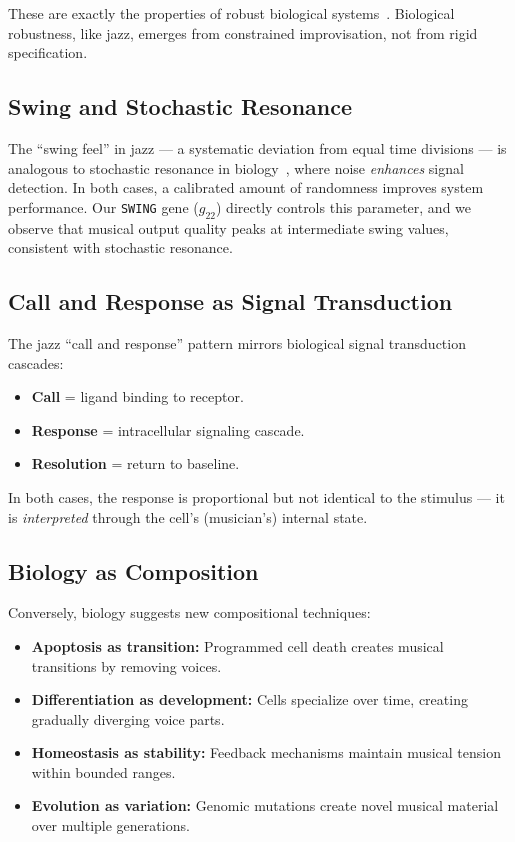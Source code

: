 \documentclass[11pt,a4paper]{article}
\begin{document}
These are exactly the properties of robust biological systems~\citep{kitano2007}. Biological robustness, like jazz, emerges from constrained improvisation, not from rigid specification.

\subsection{Swing and Stochastic Resonance}

The ``swing feel'' in jazz --- a systematic deviation from equal time divisions --- is analogous to stochastic resonance in biology~\citep{benzi1982}, where noise \emph{enhances} signal detection. In both cases, a calibrated amount of randomness improves system performance. Our \texttt{SWING} gene ($g_{22}$) directly controls this parameter, and we observe that musical output quality peaks at intermediate swing values, consistent with stochastic resonance.

\subsection{Call and Response as Signal Transduction}

The jazz ``call and response'' pattern mirrors biological signal transduction cascades:
\begin{itemize}
  \item \textbf{Call} = ligand binding to receptor.
  \item \textbf{Response} = intracellular signaling cascade.
  \item \textbf{Resolution} = return to baseline.
\end{itemize}

In both cases, the response is proportional but not identical to the stimulus --- it is \emph{interpreted} through the cell's (musician's) internal state.

\subsection{Biology as Composition}

Conversely, biology suggests new compositional techniques:
\begin{itemize}
  \item \textbf{Apoptosis as transition:} Programmed cell death creates musical transitions by removing voices.
  \item \textbf{Differentiation as development:} Cells specialize over time, creating gradually diverging voice parts.
  \item \textbf{Homeostasis as stability:} Feedback mechanisms maintain musical tension within bounded ranges.
  \item \textbf{Evolution as variation:} Genomic mutations create novel musical material over multiple generations.
\end{itemize}
\end{document}
